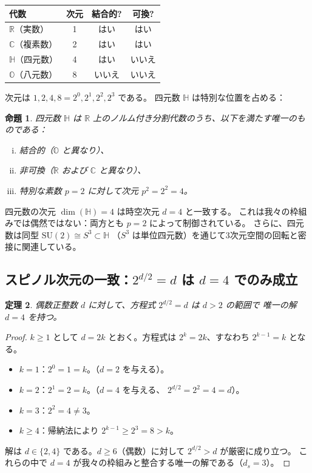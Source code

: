 \documentclass[12pt,a4paper]{article}
\newtheorem{theorem}{定理}[section]
\newtheorem{proposition}[theorem]{命題}
\theoremstyle{definition}
\newcommand{\RR}{\mathbb{R}}
\newcommand{\CC}{\mathbb{C}}
\newcommand{\HH}{\mathbb{H}}
\newcommand{\OO}{\mathbb{O}}
\begin{document}
\begin{center}
\begin{tabular}{lccc}
\toprule
\textbf{代数} & \textbf{次元} & \textbf{結合的?} & \textbf{可換?} \\
\midrule
$\RR$（実数） & 1 & はい & はい \\
$\CC$（複素数） & 2 & はい & はい \\
$\HH$（四元数） & 4 & はい & いいえ \\
$\OO$（八元数） & 8 & いいえ & いいえ \\
\bottomrule
\end{tabular}
\end{center}

次元は $1, 2, 4, 8 = 2^0, 2^1, 2^2, 2^3$ である。
四元数 $\HH$ は特別な位置を占める：

\begin{proposition}\label{prop:quaternion}
四元数 $\HH$ は $\RR$ 上のノルム付き分割代数のうち、以下を満たす唯一のものである：
\begin{enumerate}[(i)]
  \item 結合的（$\OO$ と異なり）、
  \item 非可換（$\RR$ および $\CC$ と異なり）、
  \item 特別な素数 $p=2$ に対して次元 $p^2 = 2^2 = 4$。
\end{enumerate}
\end{proposition}

四元数の次元 $\dim(\HH) = 4$ は時空次元 $d=4$ と一致する。
これは我々の枠組みでは偶然ではない：両方とも $p=2$ によって制御されている。
さらに、四元数は同型 $\mathrm{SU}(2) \cong S^3 \subset \HH$
（$S^3$ は単位四元数）を通じて3次元空間の回転と密接に関連している。

\subsection{スピノル次元の一致：$2^{d/2} = d$ は $d=4$ でのみ成立}

\begin{theorem}\label{thm:spinor}
偶数正整数 $d$ に対して、方程式 $2^{d/2} = d$ は $d > 2$ の範囲で
唯一の解 $d = 4$ を持つ。
\end{theorem}

\begin{proof}
$k \geq 1$ として $d = 2k$ とおく。方程式は $2^k = 2k$、すなわち
$2^{k-1} = k$ となる。
\begin{itemize}
  \item $k = 1$：$2^0 = 1 = k$。\checkmark（$d = 2$ を与える）。
  \item $k = 2$：$2^1 = 2 = k$。\checkmark（$d = 4$ を与える、
    $2^{d/2} = 2^2 = 4 = d$）。
  \item $k = 3$：$2^2 = 4 \neq 3$。
  \item $k \geq 4$：帰納法により $2^{k-1} \geq 2^3 = 8 > k$。
\end{itemize}
解は $d \in \{2, 4\}$ である。$d \geq 6$（偶数）に対して $2^{d/2} > d$ が厳密に成り立つ。
これらの中で $d = 4$ が我々の枠組みと整合する唯一の解である（$d_s = 3$）。
\end{proof}
\end{document}
